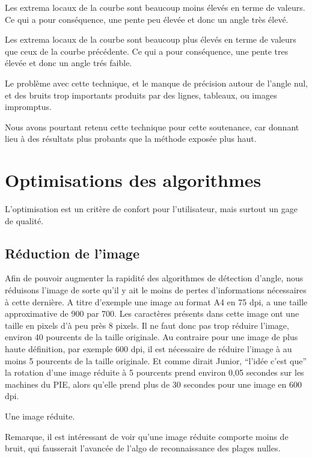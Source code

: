Les extrema locaux de la courbe sont beaucoup moins \'elev\'es en
terme de valeurs. Ce qui a pour cons\'equence, une pente peu \'elev\'ee et donc un angle tr\`es \'elev\'e.


Les extrema locaux de la courbe sont beaucoup plus \'elev\'es en
terme de valeurs que ceux de la courbe pr\'ec\'edente. Ce qui a pour
cons\'equence, une pente tres \'elev\'ee et donc un angle tr\'es faible.

Le probl\`eme avec cette technique, et le manque de pr\'ecision autour
de l'angle nul, et des bruits trop importants produits par des lignes,
tableaux, ou images impromptus.

Nous avons pourtant retenu cette technique pour cette soutenance, car
donnant lieu \`a des r\'esultats plus probants que la m\'ethode expos\'ee
plus haut.

\section{ Optimisations des algorithmes }
 L'optimisation est un crit\`ere de confort pour l'utilisateur, mais
 surtout un gage de qualit\'e.
\subsection{ R\'eduction de l'image }
 Afin de pouvoir augmenter la rapidit\'e des algorithmes de d\'etection
 d'angle, nous r\'eduisons l'image de sorte qu'il y ait le moins de
 pertes d'informations n\'ecessaires \`a cette derni\`ere. A titre
 d'exemple une image au format A4 en 75 dpi, a une taille approximative
 de 900 par 700. Les caract\`eres pr\'esents dans cette image ont une
 taille en pixels d'\`a peu pr\`es 8 pixels. Il ne faut donc pas trop
 r\'eduire l'image, environ 40 pourcents de la taille originale. Au
 contraire pour une image de plus haute d\'efinition, par exemple 600
 dpi, il est n\'ecessaire de r\'eduire l'image \`a au moins 5 pourcents
 de la taille originale. Et comme dirait Junior, ``l'id\'ee c'est
 que'' la rotation d'une image r\'eduite \`a 5 pourcents prend environ
 0,05 secondes sur les machines du PIE, alors qu'elle prend plus de 30
 secondes pour une image en 600 dpi.

Une image r\'eduite.

Remarque, il est int\'eressant de voir qu'une image r\'eduite comporte
moins de bruit, qui fausserait l'avanc\'ee de l'algo de reconnaissance
des plages nulles.

